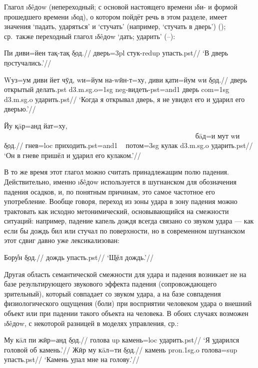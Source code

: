 Глагол \i{δêдоw} (непереходный; с основой настоящего времени \i{δи}- и формой прошедшего времени \i{δод}), о котором пойдёт речь в этом разделе, имеет значения ‘падать, ударяться’ и ‘стучать’ (например, ‘стучать в дверь’) (); ср.~также переходный глагол \i{δêдоw} ‘дать; ударить’ (–):

\begingl
\gla Пи диви=йен тақ-тақ \b{δод}.//
 дверь={\sc 3pl} стук-{\sc redup} упасть.{\sc pst}//
\glft ‘В дверь \b{постучались}.’//
\endgl \xe

\begingl
\gla Wуз=ум диви йет чӯд, wи=йум на-wӣн-т=ху, диви қати=йум wи \b{δод}.//
 дверь открытый делать.{\sc pst} {\sc d3.m.sg.o=1sg} {\sc neg}-видеть-{\sc pst=and1} дверь {\sc com=1sg} {\sc d3.m.sg.o} ударить.{\sc pst}//
\glft ‘Когда я открывал дверь, я не увидел его и \b{ударил} его дверью.’//
\endgl \xe

\begingl
\gla Йу қāр=анд йат=ху, ~~~~~~~~~~~~~~~~~~~~~~~~~~~~~~~~~~~~~~~~~~~~~~~~~~~~~~ бāд=и мут wи \b{δод}.//
 гнев={\sc loc} приходить.{\sc pst=and1} ~ потом={\sc 3sg} кулак {\sc d3.m.sg.o} ударить.{\sc pst}//
\glft ‘Он в гневе пришёл и \b{ударил} его кулаком.’//
\endgl \xe

В то же время этот глагол можно считать принадлежащим полю падения. Действительно, именно \i{δêдоw} используется в шугнанском для обозначения падения осадков, и, по понятным причинам, это самое частотное его употребление. Вообще говоря, переход из зоны удара в зону падения можно трактовать как исходно метонимический, основывающийся на смежности ситуаций: например, падение капель дождя всегда связано со звуком удара — как если бы дождь бил или стучал по поверхности, но в современном шугнанском этот сдвиг давно уже лексикализован:

\begingl
\gla Бору̊н \b{δод}.//
\glc дождь упасть.{\sc pst}//
\glft ‘\b{Шёл} дождь.’//
\endgl \xe

Другая область семантической смежности для удара и падения возникает не на базе результирующего звукового эффекта падения (сопровождающего зрительный), который совпадает со звуком удара, а на базе совпадения физиологического ощущения (боли) при восприятии человеком удара о внешний объект или при падении такого объекта на человека. В обоих случаях возможен \i{δêдоw}, с некоторой разницей в моделях управления, ср.:

\a \begingl
\gla Му кāл пи жӣр=анд \b{δод}.//
 голова {\sc up} камень={\sc loc} ударить.{\sc pst}//
\glft ‘Я \b{ударился} головой об камень.’//
\endgl
\a \begingl
\gla Жӣр му кāл=ти \b{δод}.//
\glc камень {\sc pron.1sg.o} голова={\sc sup} упасть.{\sc pst}//
\glft ‘Камень \b{упал} мне на голову.’//
\endgl \xe

